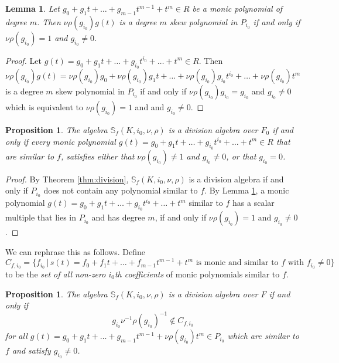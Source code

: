 \documentclass[12pt]{amsart}
\theoremstyle{plain}
\newtheorem{lemma}[theorem]{Lemma}
\newtheorem{proposition}[theorem]{Proposition}
\theoremstyle{definition}
\numberwithin{equation}{section}
\numberwithin{figure}{section}
\begin{document}
\begin{lemma}\label{le:one}
Let $g_0+g_1t+\dots+g_{m-1}t^{m-1}+t^m\in R$ be a monic polynomial of degree $m$. Then $\nu\rho(g_{i_0})g(t)$
is a degree $m$ skew polynomial in $P_{i_0}$ if and only if
$\nu\rho(g_{i_0}) =1$ and $g_{i_0}\not=0$.
\end{lemma}

\begin{proof}
Let $g(t)=g_0+g_1t+\dots+ g_{i_0}t^{i_0}+\dots +t^m\in R$.  Then $$\nu\rho(g_{i_0})g(t)=\nu\rho(g_{i_0})g_0+\nu\rho(g_{i_0})g_1t+\dots+\nu\rho(g_{i_0}) g_{i_0}t^{i_0}+\dots +\nu\rho(g_{i_0})t^m$$
is a degree $m$ skew polynomial in $P_{i_0}$ if and only if $\nu\rho(g_{i_0}) g_{i_0}=g_{i_0}$ and $g_{i_0}\not=0$ which is equivalent to
$\nu\rho(g_{i_0}) =1$ and and $g_{i_0}\not=0$.
\end{proof}

\begin{proposition} \label{thm:division2}
The algebra
$\mathbb{S}_f(K,i_0,\nu,\rho)$  is a division algebra over $F_0$ if and only if  every
 monic polynomial $g(t)=g_0+g_1t+\dots+ g_{i_0}t^{i_0}+\dots +t^m\in R$ that are similar to $f$, satisfies either that $\nu\rho(g_{i_0})\not =1$ and $g_{i_0}\not=0$, or that $g_{i_0}=0$.
\end{proposition}

\begin{proof}
 By Theorem \ref{thm:division},
$\mathbb{S}_f(K,i_0,\nu,\rho)$  is a division algebra if and only if  $ P_{i_0} $ does not contain any polynomial similar to $f$. By Lemma \ref{le:one},
 a monic polynomial $g(t)=g_0+g_1t+\dots+ g_{i_0}t^{i_0}+\dots +t^m$ similar to $f$ has a scalar multiple that lies in $P_{i_0} $ and has degree $m$,  if and only if $\nu\rho(g_{i_0}) =1$ and $g_{i_0}\not=0$.
\end{proof}

We can rephrase this as follows. Define
$$C_{f,{i_0}}=\{ f_{i_0}\,|\, s (t)=f_0+f_1t+\dots+f_{m-1}t^{m-1}+t^m \text{ is monic and similar to } f \text{ with } f_{i_0}\not=0\}$$
 to be the \emph{set of all non-zero $i_{0}$th coefficients} of monic polynomials similar to $f$.


\begin{proposition}\label{thm:normI}
The algebra
$\mathbb{S}_f(K,i_0,\nu,\rho)$  is a division algebra over $F$ if and only if
$$ g_{i_0}\nu^{-1}\rho(g_{i_0})^{-1}\not \in C_{f,{i_0}}$$
 for all $g(t)=g_0+g_1t+\dots+g_{m-1}t^{m-1}+\nu\rho(g_{i_0})t^m\in P_{i_0}$ which are similar to $f$ and  satisfy $g_{i_0}\not=0$.
\end{proposition}
\end{document}
